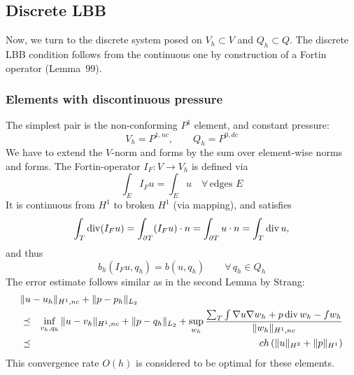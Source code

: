 \subsection{Discrete LBB}

Now, we turn to the discrete system posed on $V_h \subset V$ and $Q_h \subset Q$. 
The discrete LBB condition follows from the continuous one by
construction of a Fortin operator (Lemma~99).

\subsubsection{Elements with discontinuous pressure}
The simplest pair is the non-conforming $P^1$ element, and constant pressure:
$$
V_h  = P^{1,nc}, \qquad Q_h = P^{0,dc}
$$
We have to extend the $V$-norm and forms by the sum over element-wise norms and forms.
The Fortin-operator $I_F : V \rightarrow V_h$ is defined via
$$
\int_E I_F u = \int_E u \quad \forall \, \text{edges } E
$$
It is continuous from $H^1$ to broken $H^1$ (via mapping), and satisfies
$$
\int_T \operatorname{div} (I_F u) = \int_{\partial T} (I_F u) \cdot n = \int_{\partial T} u \cdot n = \int_T \operatorname{div} u,
$$
and thus
$$
b_h(I_F u, q_h) = b(u, q_h) \qquad \forall \, q_h \in Q_h
$$
The error estimate follows similar as in the second Lemma by Strang:
\begin{eqnarray*}
\lefteqn{\| u - u_h\|_{H^1,nc} + \| p - p_h \|_{L_2}} \\
& \leqc &\inf_{v_h, q_h} \| u - v_h \|_{H^1,nc} + \| p - q_h\|_{L_2} 
+ \sup_{w_h} \frac{ \sum_T \int \nabla u \nabla w_h   + p \opdiv w_h - f w_h} {\| w_h \|_{H^1,nc} } \\
& \leqc & c h \, (  \| u \|_{H^2} + \| p \|_{H^1} )
\end{eqnarray*}
This convergence rate $O(h)$ is considered to be optimal for these elements.


